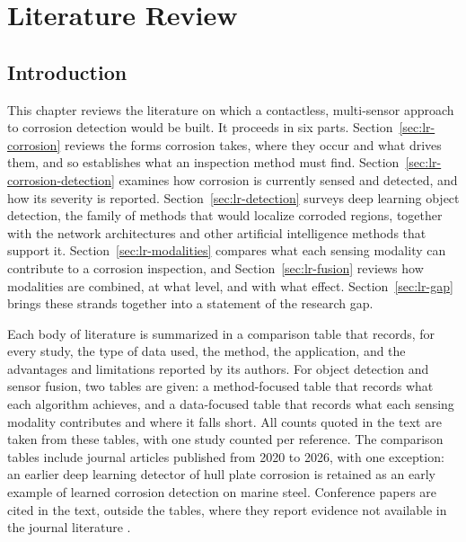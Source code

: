 \providecommand{\cmY}{$\checkmark$}
\providecommand{\cmN}{--}
\chapter[LITERATURE REVIEW]{Literature Review}
\label{ch:literature-review}

\section{Introduction}
\label{sec:lr-introduction}

This chapter reviews the literature on which a contactless, multi-sensor
approach to corrosion detection would be built. It proceeds in six parts.
Section~\ref{sec:lr-corrosion} reviews the forms corrosion takes, where they
occur and what drives them, and so establishes what an inspection method must
find. Section~\ref{sec:lr-corrosion-detection} examines how corrosion is
currently sensed and detected, and how its severity is reported.
Section~\ref{sec:lr-detection} surveys deep learning object detection, the
family of methods that would localize corroded regions, together with the
network architectures and other artificial intelligence methods that support it.
Section~\ref{sec:lr-modalities} compares what each sensing modality can
contribute to a corrosion inspection, and Section~\ref{sec:lr-fusion} reviews
how modalities are combined, at what level, and with what effect.
Section~\ref{sec:lr-gap} brings these strands together into a statement of the
research gap.

Each body of literature is summarized in a comparison table that records, for
every study, the type of data used, the method, the application, and the
advantages and limitations reported by its authors. For object detection and
sensor fusion, two tables are given: a method-focused table that records what
each algorithm achieves, and a data-focused table that records what each sensing
modality contributes and where it falls short. All counts quoted in the text are
taken from these tables, with one study counted per reference. The comparison
tables include journal articles published from 2020 to 2026, with one exception:
an earlier deep learning detector of hull plate corrosion \citep{Yao2019} is retained as
an early example of learned corrosion detection on marine steel. Conference papers are cited in the text, outside
the tables, where they report evidence not available in the journal literature
\citep{Soares2023,Ding2025,Zheng2025,Haitz2022,Mota2024}.


